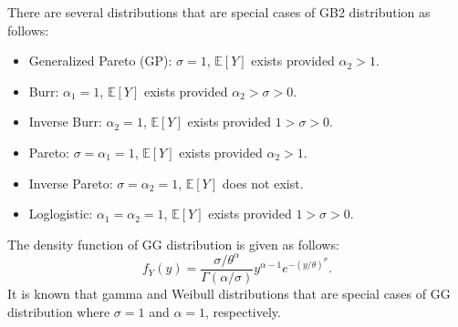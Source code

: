 \documentclass[11pt]{article}
\begin{document}
There are several distributions that are special cases of GB2 distribution as follows:
\begin{itemize}
	\item Generalized Pareto (GP): $\sigma=1$, $\mathbb{E}[Y]$ exists provided $\alpha_2>1$.
	\item Burr: $\alpha_1=1$, $\mathbb{E}[Y]$ exists provided $\alpha_2>\sigma >0$.
	\item Inverse Burr: $\alpha_2=1$, $\mathbb{E}[Y]$ exists provided $1>\sigma >0$.
	\item Pareto: $\sigma=\alpha_1=1$, $\mathbb{E}[Y]$ exists provided $\alpha_2>1$.
	\item Inverse Pareto: $\sigma=\alpha_2=1$, $\mathbb{E}[Y]$ does not exist.
	\item Loglogistic: $\alpha_1=\alpha_2=1$, $\mathbb{E}[Y]$ exists provided $1>\sigma >0$.
\end{itemize}

The density function of GG distribution is given as follows:
$$
f_{Y}(y)={\frac  {\sigma/\theta^{\alpha}}{\Gamma (\alpha/\sigma)}}y^{{\alpha-1}}e^{{-(y/\theta)^{\sigma}}}.
$$
It is known that gamma and Weibull distributions that are special cases of GG distribution where $\sigma=1$ and $\alpha=1$, respectively.
\end{document}
